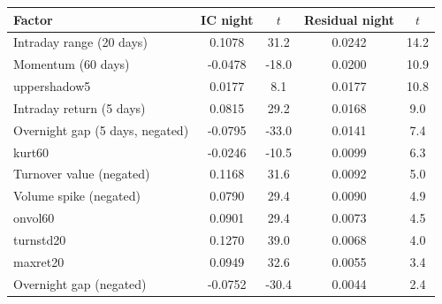 {\footnotesize
\setlength{\tabcolsep}{3pt}
\begin{tabular}{lcccc}
\toprule
\textbf{Factor} & \textbf{IC night} & \textbf{$t$} & \textbf{Residual night} & \textbf{$t$} \\
\midrule
Intraday range (20 days) & 0.1078 & 31.2 & 0.0242 & 14.2 \\
Momentum (60 days) & -0.0478 & -18.0 & 0.0200 & 10.9 \\
uppershadow5 & 0.0177 & 8.1 & 0.0177 & 10.8 \\
Intraday return (5 days) & 0.0815 & 29.2 & 0.0168 & 9.0 \\
Overnight gap (5 days, negated) & -0.0795 & -33.0 & 0.0141 & 7.4 \\
kurt60 & -0.0246 & -10.5 & 0.0099 & 6.3 \\
Turnover value (negated) & 0.1168 & 31.6 & 0.0092 & 5.0 \\
Volume spike (negated) & 0.0790 & 29.4 & 0.0090 & 4.9 \\
onvol60 & 0.0901 & 29.4 & 0.0073 & 4.5 \\
turnstd20 & 0.1270 & 39.0 & 0.0068 & 4.0 \\
maxret20 & 0.0949 & 32.6 & 0.0055 & 3.4 \\
Overnight gap (negated) & -0.0752 & -30.4 & 0.0044 & 2.4 \\
\bottomrule
\end{tabular}
}
